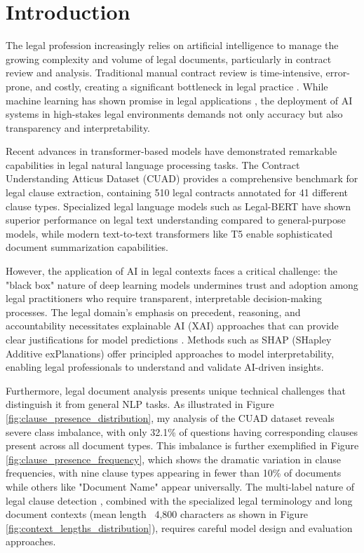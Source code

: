 \section{Introduction}

The legal profession increasingly relies on artificial intelligence to manage the growing complexity and volume of legal documents, particularly in contract review and analysis. Traditional manual contract review is time-intensive, error-prone, and costly, creating a significant bottleneck in legal practice \cite{katz2017general}. While machine learning has shown promise in legal applications \cite{zhong2018legal, sulea2017exploring}, the deployment of AI systems in high-stakes legal environments demands not only accuracy but also transparency and interpretability.

Recent advances in transformer-based models have demonstrated remarkable capabilities in legal natural language processing tasks. The Contract Understanding Atticus Dataset (CUAD) \cite{hendrycks2021cuad} provides a comprehensive benchmark for legal clause extraction, containing 510 legal contracts annotated for 41 different clause types. Specialized legal language models such as Legal-BERT \cite{chalkidis2020legal} have shown superior performance on legal text understanding compared to general-purpose models, while modern text-to-text transformers like T5 \cite{raffel2020t5} enable sophisticated document summarization capabilities.

However, the application of AI in legal contexts faces a critical challenge: the "black box" nature of deep learning models undermines trust and adoption among legal practitioners who require transparent, interpretable decision-making processes. The legal domain's emphasis on precedent, reasoning, and accountability necessitates explainable AI (XAI) approaches that can provide clear justifications for model predictions \cite{molnar2020interpretable}. Methods such as SHAP (SHapley Additive exPlanations) \cite{lundberg2017unified} offer principled approaches to model interpretability, enabling legal professionals to understand and validate AI-driven insights.

Furthermore, legal document analysis presents unique technical challenges that distinguish it from general NLP tasks. As illustrated in Figure \ref{fig:clause_presence_distribution}, my analysis of the CUAD dataset reveals severe class imbalance, with only 32.1\% of questions having corresponding clauses present across all document types. This imbalance is further exemplified in Figure \ref{fig:clause_presence_frequency}, which shows the dramatic variation in clause frequencies, with nine clause types appearing in fewer than 10\% of documents while others like "Document Name" appear universally. The multi-label nature of legal clause detection \cite{liu2021multilabel}, combined with the specialized legal terminology and long document contexts (mean length ~4,800 characters as shown in Figure \ref{fig:context_lengths_distribution}), requires careful model design and evaluation approaches.

